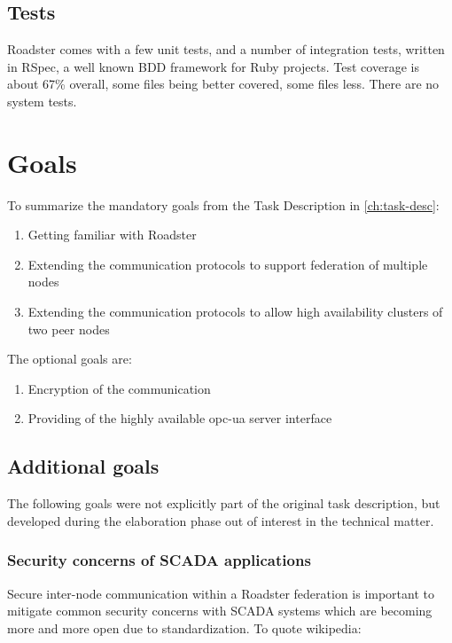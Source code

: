 \subsection{Tests}
Roadster comes with a few unit tests, and a number of integration tests,
written in RSpec, a well known \gls{BDD} framework for Ruby projects. Test coverage is
about 67\% overall, some files being better covered, some files less. There are
no system tests.

\section{Goals}

To summarize the mandatory goals from the Task Description in \autoref{ch:task-desc}:

\begin{enumerate}
	\item Getting familiar with Roadster
	\item Extending the communication protocols to support federation of
		multiple nodes
	\item Extending the communication protocols to allow high availability
		clusters of two peer nodes
\end{enumerate}

The optional goals are:

\begin{enumerate}
	\item Encryption of the communication
	\item Providing of the highly available \gls{opc-ua} server interface
\end{enumerate}

\subsection{Additional goals}
The following goals were not explicitly part of the original task description,
but developed during the elaboration phase out of interest in the technical
matter.

\subsubsection{Security concerns of SCADA applications}
Secure inter-node communication within a Roadster federation is important to
mitigate common security concerns with SCADA systems which are becoming more
and more open due to standardization. To quote \cite[Security issues]{wp:scada}
wikipedia:

